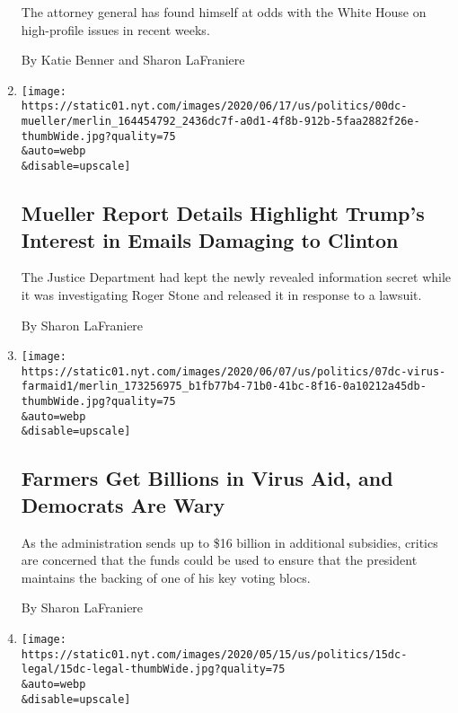 \begin{enumerate}
  The attorney general has found himself at odds with the White House on
  high-profile issues in recent weeks.

  By Katie Benner and Sharon LaFraniere
\item
  \href{/2020/06/19/us/politics/mueller-report-redactions-roger-stone.html}{}

  \texttt{[image: https://static01.nyt.com/images/2020/06/17/us/politics/00dc-mueller/merlin\_164454792\_2436dc7f-a0d1-4f8b-912b-5faa2882f26e-thumbWide.jpg?quality=75\\\&auto=webp\\\&disable=upscale]}

  \hypertarget{mueller-report-details-highlight-trumps-interest-in-emails-damaging-to-clinton}{%
  \subsection{Mueller Report Details Highlight Trump's Interest in
  Emails Damaging to
  Clinton}\label{mueller-report-details-highlight-trumps-interest-in-emails-damaging-to-clinton}}

  The Justice Department had kept the newly revealed information secret
  while it was investigating Roger Stone and released it in response to
  a lawsuit.

  By Sharon LaFraniere
\item
  \href{/2020/06/07/us/politics/virus-trump-aid-farmers.html}{}

  \texttt{[image: https://static01.nyt.com/images/2020/06/07/us/politics/07dc-virus-farmaid1/merlin\_173256975\_b1fb77b4-71b0-41bc-8f16-0a10212a45db-thumbWide.jpg?quality=75\\\&auto=webp\\\&disable=upscale]}

  \hypertarget{farmers-get-billions-in-virus-aid-and-democrats-are-wary}{%
  \subsection{Farmers Get Billions in Virus Aid, and Democrats Are
  Wary}\label{farmers-get-billions-in-virus-aid-and-democrats-are-wary}}

  As the administration sends up to \$16 billion in additional
  subsidies, critics are concerned that the funds could be used to
  ensure that the president maintains the backing of one of his key
  voting blocs.

  By Sharon LaFraniere
\item
  \href{/2020/05/15/us/politics/michael-flynn-case-explained.html}{}

  \texttt{[image: https://static01.nyt.com/images/2020/05/15/us/politics/15dc-legal/15dc-legal-thumbWide.jpg?quality=75\\\&auto=webp\\\&disable=upscale]}


\end{enumerate}
